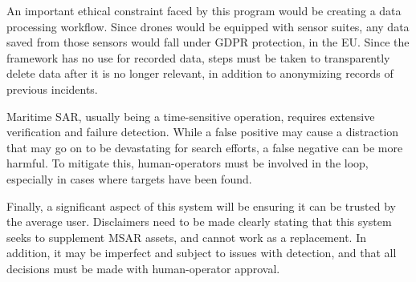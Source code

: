 An important ethical constraint faced by this program would be creating a data processing workflow.
Since drones would be equipped with sensor suites, any data saved from those sensors would fall under GDPR protection, in the EU\@.
Since the framework has no use for recorded data, steps must be taken to transparently delete data after it is no longer relevant, in addition to anonymizing records of previous incidents.

Maritime SAR, usually being a time-sensitive operation, requires extensive verification and failure detection.
While a false positive may cause a distraction that may go on to be devastating for search efforts, a false negative can be more harmful.
To mitigate this, human-operators must be involved in the loop, especially in cases where targets have been found.

Finally, a significant aspect of this system will be ensuring it can be trusted by the average user.
Disclaimers need to be made clearly stating that this system seeks to supplement MSAR assets, and cannot work as a replacement.
In addition, it may be imperfect and subject to issues with detection, and that all decisions must be made with human-operator approval.
